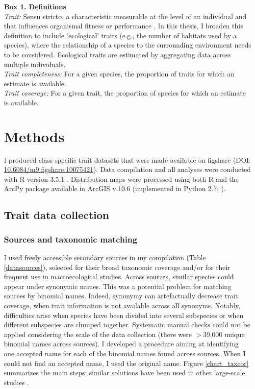 \clearpage

\begin{mdframed}
\label{Trait_definition_box}
\textbf{Box 1. Definitions}\\
\textit{Trait:} Sensu stricto, a characteristic measurable at the level of an individual and that influences organismal fitness or performance \citep{Violle2007}. In this thesis, I broaden this definition to include `ecological' traits (e.g., the number of habitats used by a species), where the relationship of a species to the surrounding environment needs to be considered. Ecological traits are estimated by aggregating data across multiple individuals.\\
\textit{Trait completeness:} For a given species, the proportion of traits for which an estimate is available.\\
\textit{Trait coverage:} For a given trait, the proportion of species for which an estimate is available.
\end{mdframed}


\section{Methods}

I produced class-specific trait datasets that were made available on figshare (DOI: \url{10.6084/m9.figshare.10075421}).
Data compilation and all analyses were conducted with R version 3.5.1 \citep{R_citation}.
Distribution maps were processed using both R and the ArcPy package available in ArcGIS v.10.6 \citep{ESRI} (implemented in Python 2.7; \citet{Python_citation}).

\subsection{Trait data collection}

\subsubsection{Sources and taxonomic matching}

I used freely accessible secondary sources in my compilation (Table \ref{datasources}), selected for their broad taxonomic coverage and/or for their frequent use in macroecological studies. Across sources, similar species could appear under synonymic names. This was a potential problem for matching sources by binomial names. Indeed, synonymy can artefactually decrease trait coverage, when trait information is not available across all synonyms. Notably, difficulties arise when species have been divided into several subspecies or when different subspecies are clumped together. Systematic manual checks could not be applied considering the scale of the data collection (there were $>$39,000 unique binomial names across sources). I developed a procedure aiming at identifying one accepted name for each of the binomial names found across sources. When I could not find an accepted name, I used the original name. Figure \ref{chart_taxcor} summarizes the main steps; similar solutions have been used in other large-scale studies \citep{Cooke2019b}.

